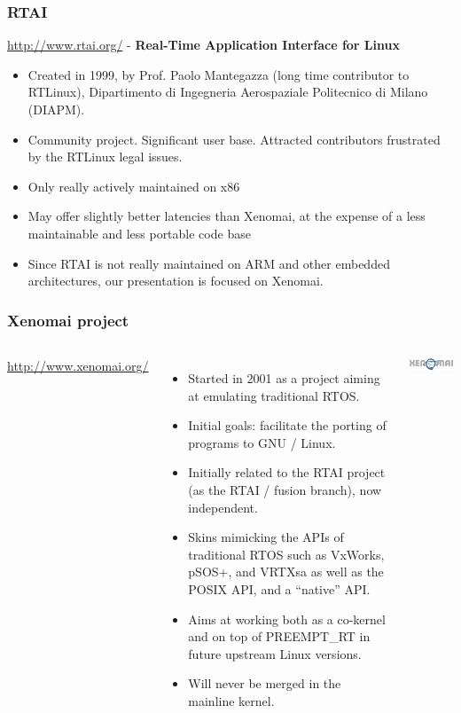 \begin{frame}
  \frametitle{RTAI}
  \url{http://www.rtai.org/} - {\bf Real-Time Application Interface for Linux}
  \begin{itemize}
  \item Created in 1999, by Prof. Paolo Mantegazza (long time
    contributor to RTLinux), Dipartimento di Ingegneria Aerospaziale
    Politecnico di Milano (DIAPM).
  \item Community project. Significant user base. Attracted
    contributors frustrated by the RTLinux legal issues.
  \item Only really actively maintained on x86
  \item May offer slightly better latencies than Xenomai, at the
    expense of a less maintainable and less portable code base
  \item Since RTAI is not really maintained on ARM and other embedded
    architectures, our presentation is focused on Xenomai.
  \end{itemize}
\end{frame}

\begin{frame}
  \frametitle{Xenomai project}
  \begin{columns}[T]
    \url{http://www.xenomai.org/}
    \begin{itemize}
    \item Started in 2001 as a project aiming at emulating traditional
      RTOS.
    \item Initial goals: facilitate the porting of programs to GNU /
      Linux.
    \item Initially related to the RTAI project (as the RTAI / fusion
      branch), now independent.
    \item Skins mimicking the APIs of traditional RTOS such as
      VxWorks, pSOS+, and VRTXsa as well as the POSIX API, and a
      “native” API.
    \item Aims at working both as a co-kernel and on top of
      PREEMPT\_RT in future upstream Linux versions.
    \item Will never be merged in the mainline kernel.
    \end{itemize}
    \includegraphics[width=\textwidth]{slides/sysdev-realtime/xenomai.png}
  \end{columns}
\end{frame}

